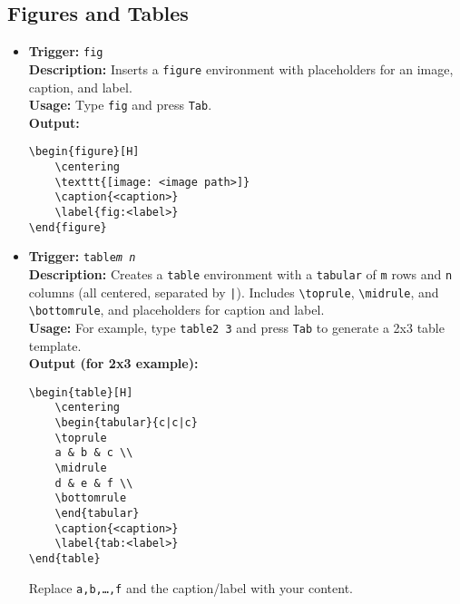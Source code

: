 \documentclass{article}
\begin{document}
\subsection{Figures and Tables}
\begin{itemize}[leftmargin=*, label={}]
\item \textbf{Trigger:} \texttt{fig} \\
\textbf{Description:} Inserts a \texttt{figure} environment with placeholders for an image, caption, and label. \\
\textbf{Usage:} Type \texttt{fig} and press \texttt{Tab}. \\
\textbf{Output:}
\begin{verbatim}
\begin{figure}[H]
    \centering
    \texttt{[image: <image path>]}
    \caption{<caption>}
    \label{fig:<label>}
\end{figure}
\end{verbatim}

\item \textbf{Trigger:} \texttt{table\textit{m} \textit{n}} \\
\textbf{Description:} Creates a \texttt{table} environment with a \texttt{tabular} of \texttt{m} rows and \texttt{n} columns (all centered, separated by \texttt{|}). Includes \texttt{\textbackslash toprule}, \texttt{\textbackslash midrule}, and \texttt{\textbackslash bottomrule}, and placeholders for caption and label. \\
\textbf{Usage:} For example, type \texttt{table2 3} and press \texttt{Tab} to generate a 2x3 table template. \\
\textbf{Output (for 2x3 example):}
\begin{verbatim}
\begin{table}[H]
    \centering
    \begin{tabular}{c|c|c}
    \toprule
    a & b & c \\
    \midrule
    d & e & f \\
    \bottomrule
    \end{tabular}
    \caption{<caption>}
    \label{tab:<label>}
\end{table}
\end{verbatim}
Replace \texttt{a,b,\dots,f} and the caption/label with your content.
\end{itemize}
\end{document}
